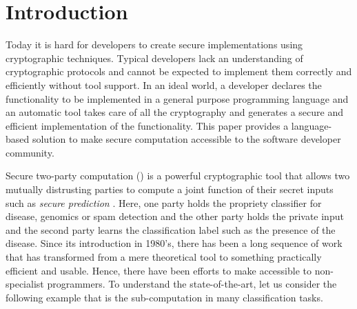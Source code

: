   
  

\section{Introduction}
\label{sec:intro}

Today it is hard for developers to create secure implementations using cryptographic techniques.
Typical developers lack an understanding of cryptographic protocols
and cannot be expected to implement them correctly and efficiently without tool
support.
In an ideal world, a developer declares the functionality to be implemented
in a general purpose programming language and an automatic tool takes care
of all the cryptography and generates a secure and efficient implementation  of the functionality. 
This paper provides a language-based solution to make
secure  computation  accessible to the software developer community. 



Secure two-party computation (\mpc) \cite{yao,gmw} is a powerful
cryptographic tool that allows two mutually distrusting parties
to compute a joint function of their secret inputs such as {\em secure prediction} \cite{shafindss,wu,barni,minionn,secureml}. Here,  one party holds the propriety classifier for disease, genomics or spam detection and the other party  
holds the private input and the second party learns the classification label such as the presence of the disease. Since its introduction
\mpc in 1980's, there has been a long sequence of work that has
transformed \mpc from a mere theoretical tool to something practically
efficient and usable. Hence, there have been efforts to make \mpc
accessible to non-specialist programmers. To understand the
state-of-the-art, let us consider the following 
example that is the sub-computation in many classification tasks.

